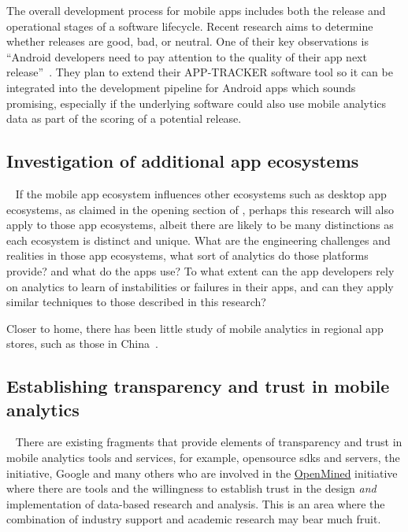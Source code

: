 The overall development process for mobile apps includes both the release and operational stages of a software lifecycle. Recent research aims to determine whether releases are good, bad, or neutral. One of their key observations is ``Android developers need to pay attention to the quality of their app next release''~. They plan to extend their \uppercase{App-Tracker} software tool so it can be integrated into the development pipeline for Android apps which sounds promising, especially if the underlying software could also use mobile analytics data as part of the scoring of a potential release.


\subsection{Investigation of additional app ecosystems}~\label{fw-investigate-additional-ecosystems}
If the mobile app ecosystem influences other ecosystems such as desktop app ecosystems, as claimed in the opening section of , perhaps this research will also apply to those app ecosystems, albeit there are likely to be many distinctions as each ecosystem is distinct and unique.  What are the engineering challenges and realities in those app ecosystems, what sort of analytics do those platforms provide? and what do the apps use? To what extent can the app developers rely on analytics to learn of instabilities or failures in their apps, and can they apply similar techniques to those described in this research? 

Closer to home, there has been little study of mobile analytics in regional app stores, such as those in China~.


\subsection{Establishing transparency and trust in mobile analytics}~\label{fw-establishing-transparency-and-trust-in-mobile-analytics}
There are existing fragments that provide elements of transparency and trust in mobile analytics tools and services, for example, opensource \Glspl{sdk} and servers, the  initiative, Google and many others who are involved in the \href{https://www.openmined.org/}{OpenMined} initiative~ %
where there are tools and the willingness to establish trust in the design \emph{and} implementation of data-based research and analysis. This is an area where the combination of industry support and academic research may bear much fruit. 

